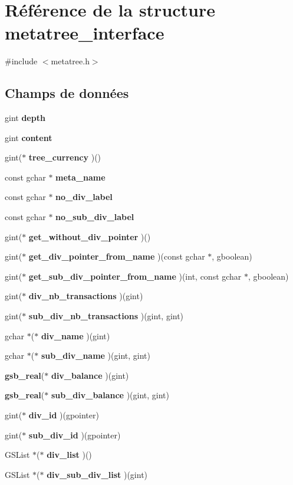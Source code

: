 \section{Référence de la structure metatree\_\-interface}
\label{structmetatree__interface}


{\ttfamily \#include $<$metatree.h$>$}

\subsection*{Champs de données}
\begin{DoxyCompactItemize}
\item 
gint {\bf depth}
\item 
gint {\bf content}
\item 
gint($\ast$ {\bf tree\_\-currency} )()
\item 
const gchar $\ast$ {\bf meta\_\-name}
\item 
const gchar $\ast$ {\bf no\_\-div\_\-label}
\item 
const gchar $\ast$ {\bf no\_\-sub\_\-div\_\-label}
\item 
gint($\ast$ {\bf get\_\-without\_\-div\_\-pointer} )()
\item 
gint($\ast$ {\bf get\_\-div\_\-pointer\_\-from\_\-name} )(const gchar $\ast$, gboolean)
\item 
gint($\ast$ {\bf get\_\-sub\_\-div\_\-pointer\_\-from\_\-name} )(int, const gchar $\ast$, gboolean)
\item 
gint($\ast$ {\bf div\_\-nb\_\-transactions} )(gint)
\item 
gint($\ast$ {\bf sub\_\-div\_\-nb\_\-transactions} )(gint, gint)
\item 
gchar $\ast$($\ast$ {\bf div\_\-name} )(gint)
\item 
gchar $\ast$($\ast$ {\bf sub\_\-div\_\-name} )(gint, gint)
\item 
{\bf gsb\_\-real}($\ast$ {\bf div\_\-balance} )(gint)
\item 
{\bf gsb\_\-real}($\ast$ {\bf sub\_\-div\_\-balance} )(gint, gint)
\item 
gint($\ast$ {\bf div\_\-id} )(gpointer)
\item 
gint($\ast$ {\bf sub\_\-div\_\-id} )(gpointer)
\item 
GSList $\ast$($\ast$ {\bf div\_\-list} )()
\item 
GSList $\ast$($\ast$ {\bf div\_\-sub\_\-div\_\-list} )(gint)
\item 

\end{DoxyCompactItemize}
